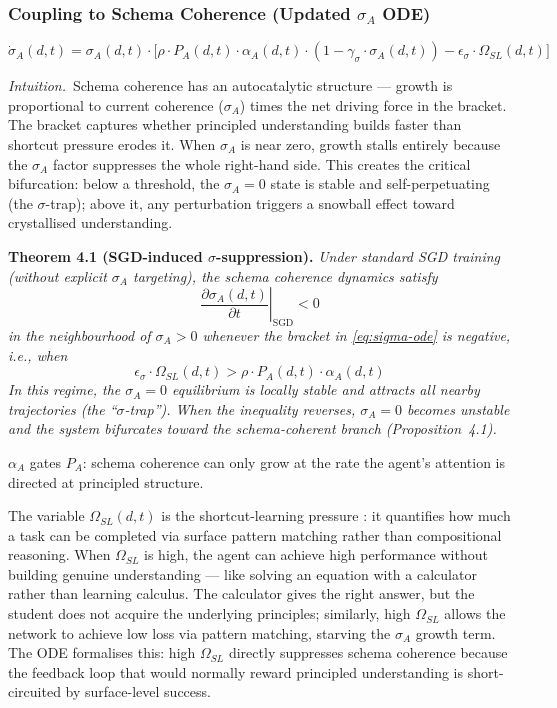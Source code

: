 \documentclass[11pt]{article}
\theoremstyle{definition}
\theoremstyle{plain}
\begin{document}
\subsubsection{Coupling to Schema Coherence (Updated \texorpdfstring{$\sigma_A$}{sigma\_A} ODE)}
\begin{equation}\label{eq:sigma-ode}
\dot{\sigma}_A(d,t) = \sigma_A(d,t) \cdot \bigl[ \rho \cdot P_A(d,t) \cdot \alpha_A(d,t) \cdot (1 - \gamma_{\sigma} \cdot \sigma_A(d,t)) - \epsilon_{\sigma} \cdot \Omega_{SL}(d,t) \bigr]
\end{equation}

\noindent\textit{Intuition.}\ Schema coherence has an autocatalytic
structure --- growth is proportional to current coherence ($\sigma_A$)
times the net driving force in the bracket. The bracket captures whether
principled understanding builds faster than shortcut pressure erodes it.
When $\sigma_A$ is near zero, growth stalls entirely because the
$\sigma_A$ factor suppresses the whole right-hand side. This creates the
critical bifurcation: below a threshold, the $\sigma_A = 0$ state is
stable and self-perpetuating (the $\sigma$-trap); above it, any
perturbation triggers a snowball effect toward crystallised
understanding.

\textbf{Theorem 4.1 (SGD-induced $\sigma$-suppression).} %
\textit{Under standard SGD training (without explicit $\sigma_A$ targeting), the schema coherence dynamics satisfy}
\[
\left.\frac{\partial \sigma_A(d,t)}{\partial t}\right|_{\text{SGD}} < 0
\]
\textit{in the neighbourhood of $\sigma_A > 0$ whenever the bracket in \eqref{eq:sigma-ode} is negative, i.e., when}
\[
\epsilon_{\sigma} \cdot \Omega_{SL}(d,t) > \rho \cdot P_A(d,t) \cdot \alpha_A(d,t)
\]
\textit{In this regime, the $\sigma_A = 0$ equilibrium is locally stable and attracts all nearby trajectories (the ``$\sigma$-trap''). When the inequality reverses, $\sigma_A = 0$ becomes unstable and the system bifurcates toward the schema-coherent branch (Proposition~4.1).}

$\alpha_A$ gates $P_A$: schema coherence can only grow at the rate the
agent's attention is directed at principled structure.

The variable $\Omega_{SL}(d,t)$ is the shortcut-learning pressure \citep{geirhos2020shortcutlearning}: it quantifies how much a task can be completed via surface pattern matching rather than compositional reasoning. When $\Omega_{SL}$ is high, the agent can achieve high performance without building genuine understanding --- like solving an equation with a calculator rather than learning calculus. The calculator gives the right answer, but the student does not acquire the underlying principles; similarly, high $\Omega_{SL}$ allows the network to achieve low loss via pattern matching, starving the $\sigma_A$ growth term. The ODE formalises this: high $\Omega_{SL}$ directly suppresses schema coherence because the feedback loop that would normally reward principled understanding is short-circuited by surface-level success.
\end{document}
